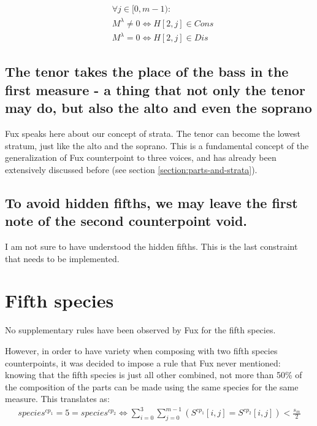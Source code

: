 \begin{equation}
\begin{aligned}
&\forall j \in [0, m-1):\\
&M^\lambda \neq 0 \iff H[2, j] \in Cons\\
&M^\lambda = 0 \iff H[2, j] \in Dis
\end{aligned}
    \label{eq:arsiscons} 
\end{equation}

\subsection{The tenor takes the place of the bass in the first measure - a thing that not only the tenor may do, but also the alto and even the soprano}
Fux speaks here about our concept of strata. The tenor can become the lowest stratum, just like the alto and the soprano. This is a fundamental concept of the generalization of Fux counterpoint to three voices, and has already been extensively discussed before (see section \ref{section:parts-and-strata}).

\subsection{To avoid hidden fifths, we may leave the first note of the second counterpoint void.}
I am not sure to have understood the hidden fifths. This is the last constraint that needs to be implemented.

\section{Fifth species}
No supplementary rules have been observed by Fux for the fifth species.

However, in order to have variety when composing with two fifth species counterpoints, it was decided to impose a rule that Fux never mentioned: knowing that the fifth species is just all other combined, not more than 50\% of the composition of the parts can be made using the same species for the same measure. This translates as:
\begin{equation}
\begin{aligned}
species^{cp_1} = 5 = species^{cp_2}  \iff \sum_{i=0}^{3} \sum_{j=0}^{m-1} (S^{cp_1}[i,j] = S^{cp_2}[i,j]) < \frac{s_m}{2}
\end{aligned}
\end{equation}
